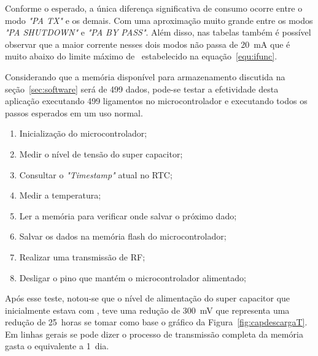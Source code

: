

Conforme o esperado, a única diferença significativa de consumo ocorre entre o modo \textit{"PA TX"} e os demais. Com uma aproximação muito grande entre os modos \textit{"PA SHUTDOWN"} e \textit{"PA BY PASS"}. Além disso, nas tabelas também é possível observar que a maior corrente nesses dois modos não passa de 20~mA que é muito abaixo do limite máximo de \ImaxCap~estabelecido na equação~\ref{equ:ifunc}.





Considerando que a memória disponível para armazenamento discutida na seção~\ref{sec:software} será de 499 dados, pode-se testar a efetividade desta aplicação executando 499 ligamentos no microcontrolador e executando todos os passos esperados em um uso normal.
\begin{enumerate}
    \item Inicialização do microcontrolador;
    \item Medir o nível de tensão do super capacitor;
    \item Consultar o \textit{"Timestamp"} atual no RTC;
    \item Medir a temperatura;
    \item Ler a memória para verificar onde salvar o próximo dado;
    \item Salvar os dados na memória flash do microcontrolador;
    \item Realizar uma transmissão de RF;
    \item Desligar o pino que mantém o microcontrolador alimentado;
\end{enumerate}

Após esse teste, notou-se que o nível de alimentação do super capacitor que inicialmente estava com \Vcap, teve uma redução de 300~mV que representa uma redução de 25~horas se tomar como base o gráfico da Figura~\ref{fig:capdescargaT}. Em linhas gerais se pode dizer o processo de transmissão completa da memória gasta o equivalente a 1~dia.





